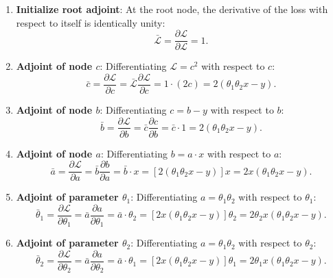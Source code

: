 \documentclass[../../main.tex]{subfiles}
\begin{document}
\begin{enumerate}[label=Step \arabic*:]
    \item \textbf{Initialize root adjoint}: At the root node, the derivative of the loss with respect to itself is identically unity:
    \begin{equation}
    \bar{\mathcal{L}} = \frac{\partial \mathcal{L}}{\partial \mathcal{L}} = 1.
    \end{equation}
    \item \textbf{Adjoint of node $c$}: Differentiating $\mathcal{L} = c^2$ with respect to $c$:
    \begin{equation}
    \bar{c} = \frac{\partial \mathcal{L}}{\partial c} = \bar{\mathcal{L}} \frac{\partial \mathcal{L}}{\partial c} = 1 \cdot \left( 2c \right) = 2\left( \theta_1 \theta_2 x - y \right).
    \end{equation}
    \item \textbf{Adjoint of node $b$}: Differentiating $c = b - y$ with respect to $b$:
    \begin{equation}
    \bar{b} = \frac{\partial \mathcal{L}}{\partial b} = \bar{c} \frac{\partial c}{\partial b} = \bar{c} \cdot 1 = 2\left( \theta_1 \theta_2 x - y \right).
    \end{equation}
    \item \textbf{Adjoint of node $a$}: Differentiating $b = a \cdot x$ with respect to $a$:
    \begin{equation}
    \bar{a} = \frac{\partial \mathcal{L}}{\partial a} = \bar{b} \frac{\partial b}{\partial a} = \bar{b} \cdot x = \left[ 2\left( \theta_1 \theta_2 x - y \right) \right] x = 2x\left( \theta_1 \theta_2 x - y \right).
    \end{equation}
    \item \textbf{Adjoint of parameter $\theta_1$}: Differentiating $a = \theta_1 \theta_2$ with respect to $\theta_1$:
    \begin{equation}
    \bar{\theta}_1 = \frac{\partial \mathcal{L}}{\partial \theta_1} = \bar{a} \frac{\partial a}{\partial \theta_1} = \bar{a} \cdot \theta_2 = \left[ 2x\left( \theta_1 \theta_2 x - y \right) \right] \theta_2 = 2\theta_2 x \left( \theta_1 \theta_2 x - y \right).
    \end{equation}
    \item \textbf{Adjoint of parameter $\theta_2$}: Differentiating $a = \theta_1 \theta_2$ with respect to $\theta_2$:
    \begin{equation}
    \bar{\theta}_2 = \frac{\partial \mathcal{L}}{\partial \theta_2} = \bar{a} \frac{\partial a}{\partial \theta_2} = \bar{a} \cdot \theta_1 = \left[ 2x\left( \theta_1 \theta_2 x - y \right) \right] \theta_1 = 2\theta_1 x \left( \theta_1 \theta_2 x - y \right).
    \end{equation}
\end{enumerate}
\end{document}
